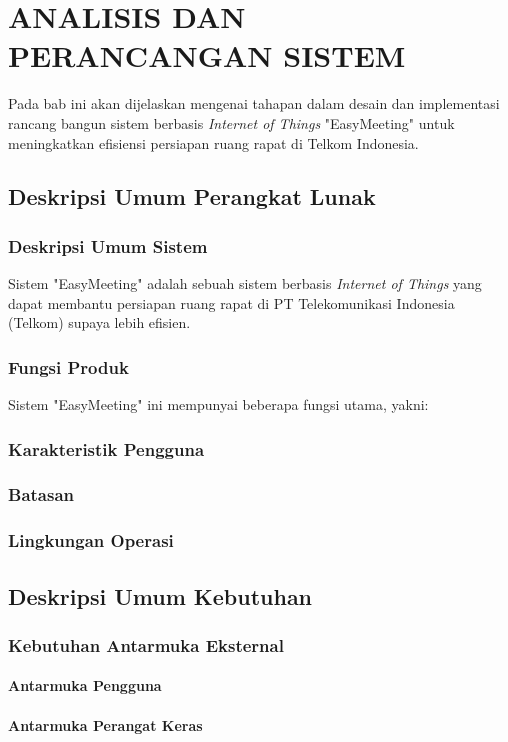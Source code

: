 \chapter{ANALISIS DAN PERANCANGAN SISTEM}
\tab Pada bab ini akan dijelaskan mengenai tahapan dalam desain dan implementasi rancang bangun sistem berbasis \textit{Internet of Things} "EasyMeeting" untuk meningkatkan efisiensi persiapan ruang rapat di Telkom Indonesia. 

\section{Deskripsi Umum Perangkat Lunak}
\subsection{Deskripsi Umum Sistem}
\tab Sistem "EasyMeeting" adalah sebuah sistem berbasis \textit{Internet of Things} yang dapat membantu persiapan ruang rapat di PT Telekomunikasi Indonesia (Telkom) supaya lebih efisien. 

\subsection{Fungsi Produk}
\tab Sistem "EasyMeeting" ini mempunyai beberapa fungsi utama, yakni:

\subsection{Karakteristik Pengguna}
\subsection{Batasan}
\subsection{Lingkungan Operasi}
\section{Deskripsi Umum Kebutuhan}
\subsection{Kebutuhan Antarmuka Eksternal}
\subsubsection{Antarmuka Pengguna}
\subsubsection{Antarmuka Perangat Keras}
